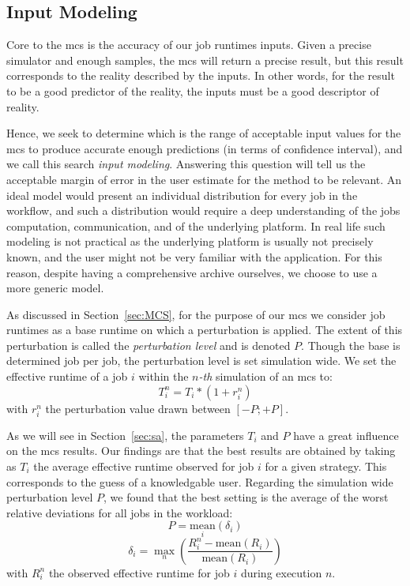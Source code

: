 \documentclass[10pt,conference,compsocconf]{IEEEtran}
\begin{document}
\subsection{Input Modeling}\label{sec:im}

Core  to the  \acl{mcs} is  the accuracy  of our  job runtimes  inputs. Given  a
precise simulator and enough samples, the \ac{mcs} will return a precise result,
but this  result corresponds to  the reality described  by the inputs.  In other
words, for the result to be a good  predictor of the reality, the inputs must be
a good descriptor of reality.

Hence, we seek  to determine which is  the range of acceptable  input values for
the  \ac{mcs} to  produce accurate  enough predictions  (in terms  of confidence
interval),  and we call this  search \emph{input  modeling}.  Answering  this
question will tell us the  acceptable margin of error in the  user estimate for the
method to be relevant.
An ideal  model would present  an individual distribution  for every job  in the
workflow, and such a distribution would require a deep understanding of the jobs
computation, communication, and  of the underlying platform.  In  real life such
modeling  is not  practical  as the  underlying platform  is  usually not
precisely  known, and  the user might not be very familiar with the application.
For this reason, despite having a comprehensive archive ourselves, we choose to 
use a more generic model.

As discussed in Section~\ref{sec:MCS}, for the purpose of our \ac{mcs} we
consider job runtimes as a base runtime on which a perturbation is applied. The
extent of this perturbation is called the \emph{perturbation level} and is
denoted $P$. Though the base is determined job per job, the perturbation level
is set simulation wide. We set the effective runtime of a job $i$ within the
$n$\textit{-th} simulation of an \ac{mcs} to: 
\begin{equation}
	T_i^n = T_i * (1+r_i^n)
\end{equation}
with $r_i^n$ the perturbation value drawn between $[-P;+P]$.

As we  will see  in Section~\ref{sec:sa},  the parameters $T_i$  and $P$  have a
great influence on the \ac{mcs} results.  Our findings are that the best results
are obtained by  taking as $T_i$ the average effective  runtime observed for job
$i$ for a given  strategy. This corresponds to the guess of a knowledgable user.
Regarding  the simulation  wide perturbation level  $P$, we found  that the best
setting  is the average  of the worst relative deviations for all jobs in the
workload:
\begin{equation}
P = \underset{i}{\textrm{mean}}(\delta{}_i)
\end{equation}
\begin{equation}
\delta{}_i =
\max_n\left(\frac{R_i^n-\textrm{mean}(R_i)}{\textrm{mean}(R_i)}\right)
\end{equation}
with $R_i^n$ the observed effective runtime for job $i$ during execution $n$. 
\end{document}
